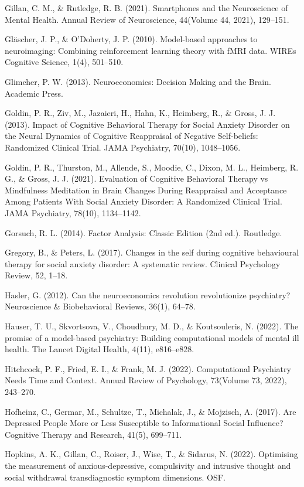 \documentclass[12pt,a4paper,oneside,]{book} %
\begin{document}
Gillan, C. M., \& Rutledge, R. B. (2021). Smartphones and the Neuroscience of Mental Health. Annual Review of Neuroscience, 44(Volume 44, 2021), 129--151.

Gläscher, J. P., \& O'Doherty, J. P. (2010). Model-based approaches to neuroimaging: Combining reinforcement learning theory with fMRI data. WIREs Cognitive Science, 1(4), 501--510.

Glimcher, P. W. (2013). Neuroeconomics: Decision Making and the Brain. Academic Press.

Goldin, P. R., Ziv, M., Jazaieri, H., Hahn, K., Heimberg, R., \& Gross, J. J. (2013). Impact of Cognitive Behavioral Therapy for Social Anxiety Disorder on the Neural Dynamics of Cognitive Reappraisal of Negative Self-beliefs: Randomized Clinical Trial. JAMA Psychiatry, 70(10), 1048--1056.

Goldin, P. R., Thurston, M., Allende, S., Moodie, C., Dixon, M. L., Heimberg, R. G., \& Gross, J. J. (2021). Evaluation of Cognitive Behavioral Therapy vs Mindfulness Meditation in Brain Changes During Reappraisal and Acceptance Among Patients With Social Anxiety Disorder: A Randomized Clinical Trial. JAMA Psychiatry, 78(10), 1134--1142.

Gorsuch, R. L. (2014). Factor Analysis: Classic Edition (2nd ed.). Routledge.

Gregory, B., \& Peters, L. (2017). Changes in the self during cognitive behavioural therapy for social anxiety disorder: A systematic review. Clinical Psychology Review, 52, 1--18.

Hasler, G. (2012). Can the neuroeconomics revolution revolutionize psychiatry? Neuroscience \& Biobehavioral Reviews, 36(1), 64--78.

Hauser, T. U., Skvortsova, V., Choudhury, M. D., \& Koutsouleris, N. (2022). The promise of a model-based psychiatry: Building computational models of mental ill health. The Lancet Digital Health, 4(11), e816--e828.

Hitchcock, P. F., Fried, E. I., \& Frank, M. J. (2022). Computational Psychiatry Needs Time and Context. Annual Review of Psychology, 73(Volume 73, 2022), 243--270.

Hofheinz, C., Germar, M., Schultze, T., Michalak, J., \& Mojzisch, A. (2017). Are Depressed People More or Less Susceptible to Informational Social Influence? Cognitive Therapy and Research, 41(5), 699--711.

Hopkins, A. K., Gillan, C., Roiser, J., Wise, T., \& Sidarus, N. (2022). Optimising the measurement of anxious-depressive, compulsivity and intrusive thought and social withdrawal transdiagnostic symptom dimensions. OSF.
\end{document}
